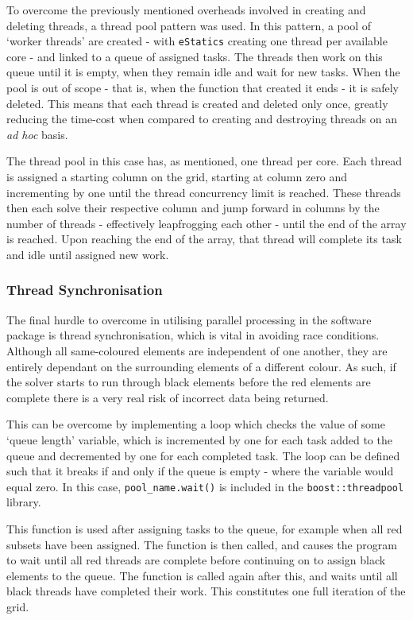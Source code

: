 			To overcome the previously mentioned overheads involved in creating and deleting threads, a thread pool pattern was used. In this pattern, a pool of `worker threads' are created - with \lstinline|eStatics| creating one thread per available core - and linked to a queue of assigned tasks. The threads then work on this queue until it is empty, when they remain idle and wait for new tasks. When the pool is out of scope - that is, when the function that created it ends - it is safely deleted. This means that each thread is created and deleted only once, greatly reducing the time-cost when compared to creating and destroying threads on an \textit{ad hoc} basis.
			
			The thread pool in this case has, as mentioned, one thread per core. Each thread is assigned a starting column on the grid, starting at column zero and incrementing by one until the thread concurrency limit is reached. These threads then each solve their respective column and jump forward in columns by the number of threads - effectively leapfrogging each other - until the end of the array is reached. Upon reaching the end of the array, that thread will complete its task and idle until assigned new work.
			
		\subsubsection{Thread Synchronisation}
		
			The final hurdle to overcome in utilising parallel processing in the software package is thread synchronisation, which is vital in avoiding race conditions. Although all same-coloured elements are independent of one another, they are entirely dependant on the surrounding elements of a different colour. As such, if the solver starts to run through black elements before the red elements are complete there is a very real risk of incorrect data being returned.
			
			This can be overcome by implementing a loop which checks the value of some `queue length' variable, which is incremented by one for each task added to the queue and decremented by one for each completed task. The loop can be defined such that it breaks if and only if the queue is empty - where the variable would equal zero. In this case, \lstinline|pool_name.wait()| is included in the \lstinline|boost::threadpool| library.
			
			This function is used after assigning tasks to the queue, for example when all red subsets have been assigned. The function is then called, and causes the program to wait until all red threads are complete before continuing on to assign black elements to the queue. The function is called again after this, and waits until all black threads have completed their work. This constitutes one full iteration of the grid.
	
